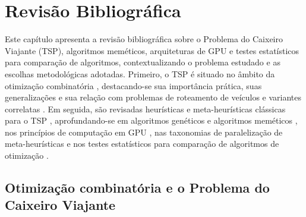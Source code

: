 \chapter{Revisão Bibliográfica}\label{cap2-revisao-bibliografica}

Este capítulo apresenta a revisão bibliográfica sobre o Problema do Caixeiro Viajante (TSP), algoritmos meméticos, arquiteturas de GPU e testes estatísticos para comparação de algoritmos, contextualizando o problema estudado e as escolhas metodológicas adotadas. Primeiro, o TSP é situado no âmbito da otimização combinatória \autocite{cook2012pursuit,rosenkrantz1977analysis}, destacando-se sua importância prática, suas generalizações e sua relação com problemas de roteamento de veículos e variantes correlatas \autocite{raff1983routing,bodin1981state,tan2021vehicle}.
Em seguida, são revisadas heurísticas e meta-heurísticas clássicas para o TSP \autocite{croes1958method,lin1973efficient,voudouris1999tsp}, aprofundando-se em algoritmos genéticos e algoritmos meméticos \autocite{larranaga1999genetic,goldberg1989genetic}, nos princípios de computação em GPU \autocite{schulz2013gpu,tsp_gpu}, nas taxonomias de paralelização de meta-heurísticas \autocite{crainic2003parallel,crainic2010parallel,alba2005parallel} e nos testes estatísticos para comparação de algoritmos de otimização \autocite{demsar2006statistical}.

\section{Otimização combinatória e o Problema do Caixeiro Viajante}\label{sec-21-otimizacao-tsp}

